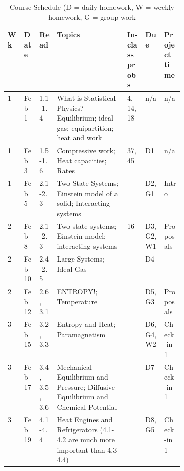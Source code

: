 \documentclass[12pt]{article}
\begin{document}
\setlength{\arrayrulewidth}{.4mm}
\setlength{\tabcolsep}{8pt}
{
  \begin{table}[]
    \footnotesize
\caption{\footnotesize{Course Schedule (D = daily homework, W = weekly homework, G = group work}}
\label{tab:course-calendar}
\begin{tabular}{p{.03\linewidth}|p{.065\linewidth}|p{.065\linewidth}|p{0.4\linewidth}|p{.08\linewidth}|p{.085\linewidth}|p{.1\linewidth}}
\textbf{Wk} & \textbf{Date}    & \textbf{Read}        & \textbf{Topics} & \textbf{In-class probs} & \textbf{Due}    & \textbf{Project time}  \\ \hline 
1    & Feb 1  & 1.1-1.4        & What is Statistical Physics? Equilibrium; ideal gas; equipartition; heat and work  & 4, 14, 18                           & n/a          & n/a           \\
1    & Feb 3  & 1.5-1.6        & Compressive work; Heat capacities; Rates                               & 37, 45                                & D1           & n/a           \\
1    & Feb 5  & 2.1-2.3        & Two-State Systems; Einstein model of a solid; Interacting systems                   &                                           & D2, G1       & Intro \\ \hline
2    & Feb 8  & 2.1-2.3 & Two-state systems; Einstein model; interacting systems      &  16 & D3, G2, W1   & \multirow{2}{*}{Proposals}     \\
2    & Feb 10 & 2.4-2.5        & Large Systems; Ideal Gas                                                                    &                                           & D4           & Proposals     \\
2    & Feb 12 & 2.6, 3.1       & ENTROPY!; Temperature                                                     &                                           & D5, G3       & Proposals     \\ \hline
3    & Feb 15 &3.2, 3.3       & Entropy and Heat; Paramagnetism   &                                           & D6, G4, W2   & Check-in 1    \\
3    & Feb 17 &3.4, 3.5, 3.6  & Mechanical Equilibrium and Pressure; Diffusive Equilibrium and Chemical Potential        &                                           & D7           & Check-in 1    \\
3    & Feb 19 & 4.1-4.4        & Heat Engines and Refrigerators (4.1-4.2 are much more important than 4.3-4.4)     &                                 & D8, G5       & Check-in 1    \\ \hline

\end{tabular}
\end{table}}
\end{document}
